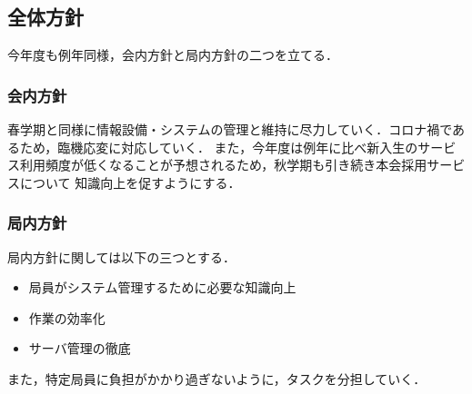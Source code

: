 \subsection*{全体方針}

今年度も例年同様，会内方針と局内方針の二つを立てる．
\subsubsection*{会内方針}
\par 春学期と同様に情報設備・システムの管理と維持に尽力していく．コロナ禍であるため，臨機応変に対応していく．
また，今年度は例年に比べ新入生のサービス利用頻度が低くなることが予想されるため，秋学期も引き続き本会採用サービスについて
知識向上を促すようにする．

\subsubsection*{局内方針}
局内方針に関しては以下の三つとする．
\begin{itemize}
    \item 局員がシステム管理するために必要な知識向上
    \item 作業の効率化
    \item サーバ管理の徹底
\end{itemize}
また，特定局員に負担がかかり過ぎないように，タスクを分担していく．
